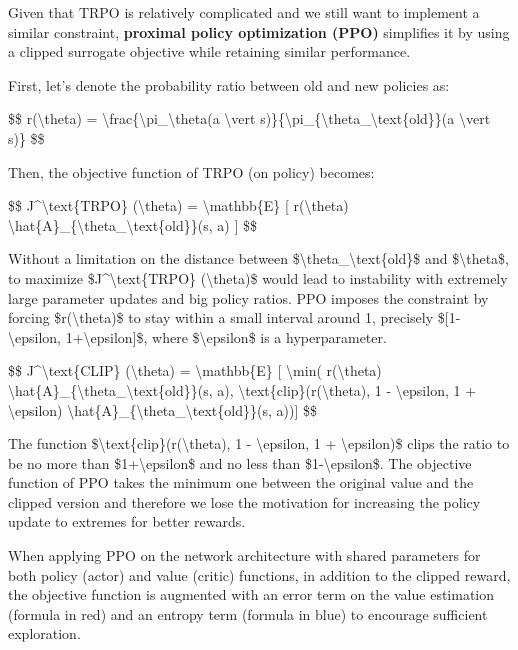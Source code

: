 Given that TRPO is relatively complicated and we still want to implement a similar constraint, \textbf{proximal policy optimization (PPO)} simplifies it by using a clipped surrogate objective while retaining similar performance.

First, let's denote the probability ratio between old and new policies as:

\$\$ r(\textbackslash theta) = \textbackslash frac\{\textbackslash pi\_\textbackslash theta(a \textbackslash vert s)\}\{\textbackslash pi\_\{\textbackslash theta\_\textbackslash text\{old\}\}(a \textbackslash vert s)\} \$\$

Then, the objective function of TRPO (on policy) becomes:

\$\$ J\^{}\textbackslash text\{TRPO\} (\textbackslash theta) = \textbackslash mathbb\{E\} {[} r(\textbackslash theta) \textbackslash hat\{A\}\_\{\textbackslash theta\_\textbackslash text\{old\}\}(s, a) {]} \$\$

\label{ppo_loss}{}Without a limitation on the distance between \$\textbackslash theta\_\textbackslash text\{old\}\$ and \$\textbackslash theta\$, to maximize \$J\^{}\textbackslash text\{TRPO\} (\textbackslash theta)\$ would lead to instability with extremely large parameter updates and big policy ratios. PPO imposes the constraint by forcing \$r(\textbackslash theta)\$ to stay within a small interval around 1, precisely \${[}1-\textbackslash epsilon, 1+\textbackslash epsilon{]}\$, where \$\textbackslash epsilon\$ is a hyperparameter.

\$\$ J\^{}\textbackslash text\{CLIP\} (\textbackslash theta) = \textbackslash mathbb\{E\} {[} \textbackslash min( r(\textbackslash theta) \textbackslash hat\{A\}\_\{\textbackslash theta\_\textbackslash text\{old\}\}(s, a), \textbackslash text\{clip\}(r(\textbackslash theta), 1 - \textbackslash epsilon, 1 + \textbackslash epsilon) \textbackslash hat\{A\}\_\{\textbackslash theta\_\textbackslash text\{old\}\}(s, a)){]} \$\$

The function \$\textbackslash text\{clip\}(r(\textbackslash theta), 1 - \textbackslash epsilon, 1 + \textbackslash epsilon)\$ clips the ratio to be no more than \$1+\textbackslash epsilon\$ and no less than \$1-\textbackslash epsilon\$. The objective function of PPO takes the minimum one between the original value and the clipped version and therefore we lose the motivation for increasing the policy update to extremes for better rewards.

When applying PPO on the network architecture with shared parameters for both policy (actor) and value (critic) functions, in addition to the clipped reward, the objective function is augmented with an error term on the value estimation (formula in red) and an entropy term (formula in blue) to encourage sufficient exploration.

